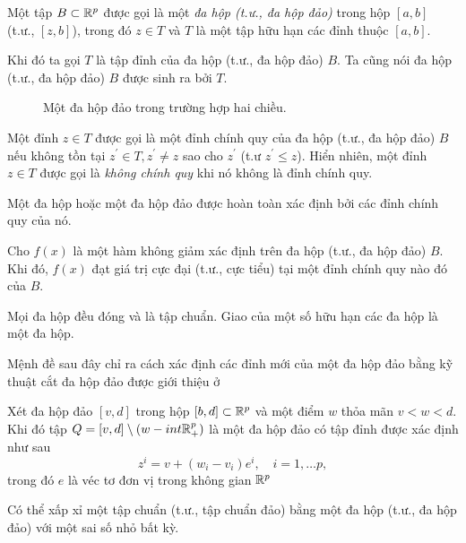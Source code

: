 \begin{dn}
    Một tập $B \subset \mathbb{R}^p$ được gọi là một \textit{đa hộp (t.ư., đa hộp đảo)} trong hộp $[a, b]$ (t.ư., $[z, b]$), trong đó $z \in T$ và $T$ là một tập hữu hạn các đỉnh thuộc $[a, b]$.
\end{dn}

Khi đó ta gọi $T$ là tập đỉnh của đa hộp (t.ư., đa hộp đảo) $B$. Ta cũng
nói đa hộp (t.ư., đa hộp đảo) $B$ được sinh ra bởi $T$.

\begin{figure}[!h]
    \centering
    \caption{ Một đa hộp đảo trong trường hợp hai chiều.}
    \label{fig:3}
\end{figure}

\begin{dn}
    Một đỉnh $z \in T$ được gọi là một đỉnh chính quy của đa hộp (t.ư., đa hộp đảo) $B$ nếu không tồn tại $z^\prime \in T, z^\prime \neq z$ sao cho $z^\prime$ (t.ư $z^\prime \leq z$). Hiển nhiên, một đỉnh $z \in T$ được gọi là \textit{không chính quy} khi nó không là đỉnh chính quy.
\end{dn}

\begin{md}
    Một đa hộp hoặc một đa hộp đảo được hoàn toàn xác định bởi các đỉnh chính quy của nó.
\end{md}

\begin{dl}
     Cho $f(x)$ là một hàm không giảm xác định trên đa hộp (t.ư., đa hộp đảo) $B$. Khi đó, $f(x)$ đạt giá trị cực đại (t.ư., cực tiểu) tại một đỉnh chính quy nào đó của $B$.
\end{dl}

\begin{md}
    Mọi đa hộp đều đóng và là tập chuẩn. Giao của một số hữu hạn các đa hộp là một đa hộp.
\end{md}
Mệnh đề sau đây chỉ ra cách xác định các đỉnh mới của một đa hộp đảo bằng kỹ thuật cắt đa hộp đảo được giới thiệu ở \cite{Tuy1999}
\begin{md}
    Xét đa hộp đảo $[v, d]$ trong hộp $[b, d] \subset \mathbb{R}^p$ và một điểm $w$ thỏa mãn $v < w < d$. Khi đó tập $Q=[v, d] \setminus (w - int \mathbb{R}^p_+)$ là một đa hộp đảo có tập đỉnh được xác định như sau
    \begin{equation*}
        z^i = v + (w_i - v_i)e^i, \quad i = 1, \dots p,
    \end{equation*}
    trong đó $e$ là véc tơ đơn vị trong không gian $\mathbb{R}^p$
\end{md}

\begin{md} 
    \label{approx_normal_set}
     Có thể xấp xỉ một tập chuẩn (t.ư.,
tập chuẩn đảo) bằng một đa hộp (t.ư., đa hộp đảo) với một sai số nhỏ
bất kỳ.
\end{md}




